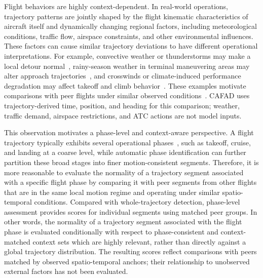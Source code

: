 \documentclass[iicol,pdflatex,sn-basic,Numbered]{sn-jnl}%
\theoremstyle{thmstyleone}%
\theoremstyle{thmstyletwo}%
\theoremstyle{thmstylethree}%
\begin{document}
Flight behaviors are highly context-dependent. 
In real-world operations, trajectory patterns are jointly shaped by the flight kinematic characteristics of aircraft itself and dynamically changing regional factors, including meteorological conditions, traffic flow, airspace constraints, and other environmental influences.
These factors can cause similar trajectory deviations to have different operational interpretations.
For example, convective weather or thunderstorms may make a local detour normal~\cite{yang2024optimising}, rainy-season weather in terminal maneuvering areas may alter approach trajectories~\cite{chen2025impact}, and crosswinds or climate-induced performance degradation may affect takeoff and climb behavior~\cite{10.1145/3459104.3459109,williams2025quantifying,mcrae2021assessing}. 
These examples motivate comparisons with peer flights under similar observed conditions~\cite{aerospace6110117,olive2020significant,chevrot2022cae,choi2023stochastic}. CAFAD uses trajectory-derived time, position, and heading for this comparison; weather, traffic demand, airspace restrictions, and ATC actions are not model inputs.

This observation motivates a phase-level and context-aware perspective. 
A flight trajectory typically exhibits several operational phases~\cite{sun2017phaseidentification}, such as takeoff, cruise, and landing at a coarse level, while automatic phase identification can further partition these broad stages into finer motion-consistent segments. 
Therefore, it is more reasonable to evaluate the normality of a trajectory segment associated with a specific flight phase by comparing it with peer segments from other flights that are in the same local motion regime and operating under similar spatio-temporal conditions.
Compared with whole-trajectory detection, phase-level assessment provides scores for individual segments using matched peer groups. 
In other words, the normality of a trajectory segment associated with the flight phase is evaluated conditionally with respect to phase-consistent and context-matched context sets which are highly relevant, rather than directly against a global trajectory distribution. 
The resulting scores reflect comparisons with peers matched by observed spatio-temporal anchors; their relationship to unobserved external factors has not been evaluated.
\end{document}
